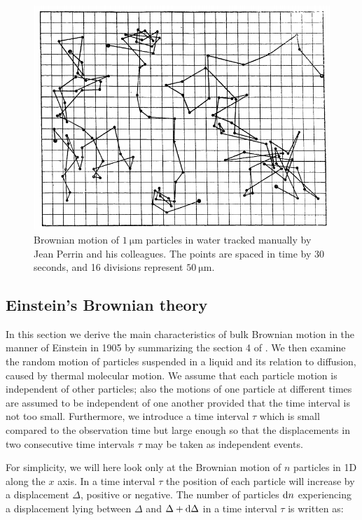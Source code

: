 \begin{figure}[h]
	\centering
	\includegraphics[scale=0.6]{02_body/chapter1/image/graph_perrin.png}
	\caption{Brownian motion of $1 ~ \mathrm{\mu m}$ particles in water tracked manually by Jean Perrin and his colleagues. The points are spaced in time by 30 seconds, and 16 divisions represent $50 ~ \mathrm{\mu m}$.}
	\label{fig:Perrin_Brownian}
\end{figure}

\subsection{Einstein's Brownian theory}

In this section we derive the main characteristics of bulk Brownian motion in the manner of Einstein in 1905 by summarizing the section 4 of \cite{einstein_uber_1905}. We then examine  the random motion of particles suspended in a liquid and its relation to diffusion, caused by thermal molecular motion. We assume that each particle motion is independent of other particles; also the motions of one particle at different times are assumed to be independent of one another provided that the time interval is not too small. Furthermore, we introduce a time interval $\tau$ which is small compared to the observation time but large enough so that  the displacements in two consecutive time intervals $\tau$ may be taken as independent events. 

For simplicity, we will here look only at the Brownian motion of $n$ particles in 1D along the $x$ axis. In a time interval $\tau$ the position of each particle will increase by a displacement $\Delta$, positive or negative. The number of particles $\textnormal{d}n$ experiencing a displacement lying between $\Delta$ and $\Delta + \textnormal{d}\Delta$ in a time interval $\tau$ is written as:

